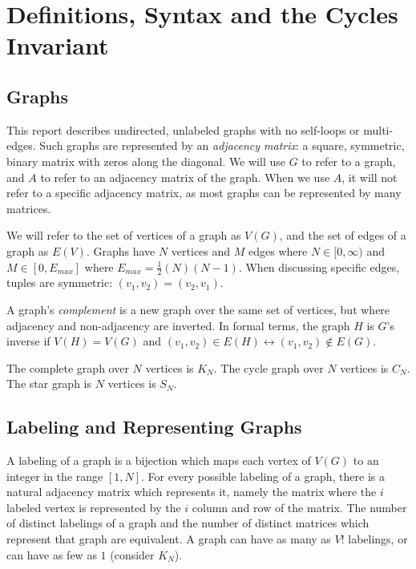 \chapter{Definitions, Syntax and the Cycles Invariant}



\section{Graphs}

This report describes undirected, unlabeled graphs with no self-loops or multi-edges.
Such graphs are represented by an \emph{adjacency matrix}: a square, symmetric, binary matrix with zeros along the diagonal.
We will use $G$ to refer to a graph, and $A$ to refer to an adjacency matrix of the graph.
When we use $A$, it will not refer to a specific adjacency matrix, as most graphs can be represented by many matrices.

We will refer to the set of vertices of a graph as $V(G)$, and the set of edges of a graph as $E(V)$.
Graphs have $N$ vertices and $M$ edges where $N \in [0, \infty)$ and $M \in [0, E_{max}]$ where ${E_{max}} = \frac{1}{2}(N)(N-1)$.
When discussing specific edges, tuples are symmetric: $(v_1, v_2) = (v_2, v_1)$.

A graph's \emph{complement} is a new graph over the same set of vertices, but where adjacency and non-adjacency are inverted.
In formal terms, the graph $H$ is $G$'s inverse if $V(H) = V(G)$ and $(v_1, v_2) \in E(H) \leftrightarrow (v_1, v_2) \notin E(G)$.

The complete graph over $N$ vertices is $K_N$. 
The cycle graph over $N$ vertices is $C_N$.
The star graph is $N$ vertices is $S_N$.



\section{Labeling and Representing Graphs}

A labeling of a graph is a bijection which maps each vertex of $V(G)$ to an integer in the range $[1, N]$.
For every possible labeling of a graph, there is a natural adjacency matrix which represents it, namely the matrix where the $i$ labeled vertex is represented by the $i$ column and row of the matrix.
The number of distinct labelings of a graph and the number of distinct matrices which represent that graph are equivalent.
A graph can have as many as $V!$ labelings, or can have as few as $1$ (consider $K_N$).

